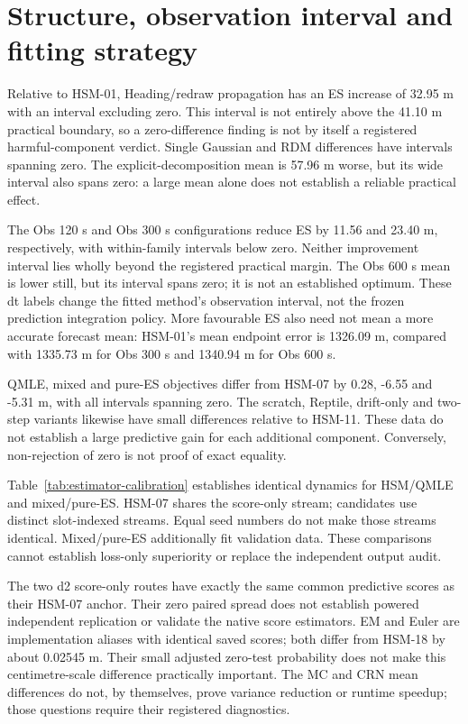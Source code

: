 \FloatBarrier
\endgroup

\section{Structure, observation interval and fitting strategy}
\label{sec:method-findings}\hypertarget{sec:method-findings}{}
Relative to HSM-01, Heading/redraw propagation has an ES increase of 32.95 m
with an interval excluding zero. This interval is not entirely above the
41.10 m practical boundary, so a zero-difference finding is not by itself
a registered harmful-component verdict. Single Gaussian and RDM
differences have intervals spanning zero. The explicit-decomposition mean
is 57.96 m worse, but its wide interval also spans zero: a large mean alone
does not establish a reliable practical effect.

The Obs 120 s and Obs 300 s configurations reduce ES by 11.56 and 23.40 m,
respectively, with within-family intervals below zero. Neither improvement
interval lies wholly beyond the registered practical margin. The Obs 600 s mean
is lower still, but its interval spans zero; it is not an established optimum.
These dt labels change the fitted method's observation interval, not the
frozen prediction integration policy. More favourable ES also need not mean
a more accurate forecast mean: HSM-01's mean endpoint error is 1326.09 m,
compared with 1335.73 m for Obs 300 s and 1340.94 m for Obs 600 s.

QMLE, mixed and pure-ES objectives differ from HSM-07 by 0.28, -6.55 and
-5.31 m, with all intervals spanning zero. The scratch, Reptile, drift-only
and two-step variants likewise have small differences relative to HSM-11.
These data do not establish a large predictive gain for each additional
component. Conversely, non-rejection of zero is not proof of exact equality.

\begin{samepage}
Table~\ref{tab:estimator-calibration} establishes identical dynamics for
HSM/QMLE and mixed/pure-ES. HSM-07 shares the score-only stream; candidates
use distinct slot-indexed streams. Equal seed numbers do not make those
streams identical. Mixed/pure-ES additionally fit validation data.
These comparisons cannot establish loss-only superiority or replace
the independent output audit.
\end{samepage}

The two d2 score-only routes have exactly the same common predictive scores
as their HSM-07 anchor. Their zero paired spread does not establish powered
independent replication or validate the native score estimators.
EM and Euler are implementation aliases with identical saved scores; both
differ from HSM-18 by about 0.02545 m. Their small adjusted zero-test probability
does not make this centimetre-scale difference practically important.
The MC and CRN mean differences do not, by themselves, prove variance reduction
or runtime speedup; those questions require their registered diagnostics.


